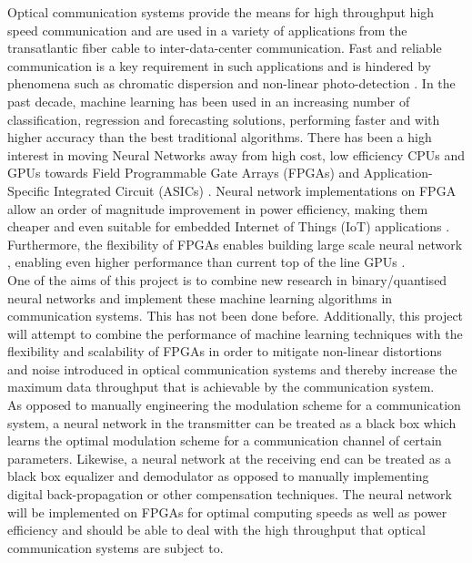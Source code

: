 Optical communication systems provide the means for high throughput high speed communication and are used in a variety of applications from the transatlantic fiber cable to inter-data-center communication. Fast and reliable communication is a key requirement in such applications and is hindered by phenomena such as chromatic dispersion and non-linear photo-detection \autocite{8433895}. In the past decade, machine learning has been used in an increasing number of classification, regression and forecasting solutions, performing faster and with higher accuracy than the best traditional algorithms. There has been a high interest in moving Neural Networks away from high cost, low efficiency CPUs and GPUs towards Field Programmable Gate Arrays (FPGAs) and Application-Specific Integrated Circuit (ASICs) \autocite{7929192}. Neural network implementations on FPGA allow an order of magnitude improvement in power efficiency, making them cheaper and even suitable for embedded Internet of Things (IoT) applications \autocite{7799795,8954866,8469659,8330546,8693488}. Furthermore, the flexibility of FPGAs enables building large scale neural network \autocite{8823487,7045812}, enabling even higher performance than current top of the line GPUs \autocite{8702332,8412552}. 
\\

One of the aims of this project is to combine new research in binary/quantised neural networks and implement these machine learning algorithms in communication systems. This has not been done before. Additionally, this project will attempt to combine the performance of machine learning techniques with the flexibility and scalability of FPGAs in order to mitigate non-linear distortions and noise introduced in optical communication systems and thereby increase the maximum data throughput that is achievable by the communication system. 
\\

As opposed to manually engineering the modulation scheme for a communication system, a neural network in the transmitter can be treated as a black box which learns the optimal modulation scheme for a communication channel of certain parameters. Likewise, a neural network at the receiving end can be treated as a black box equalizer and demodulator as opposed to manually implementing digital back-propagation or other compensation techniques. The neural network will be implemented on FPGAs for optimal computing speeds as well as power efficiency and should be able to deal with the high throughput that optical communication systems are subject to. 
\\
